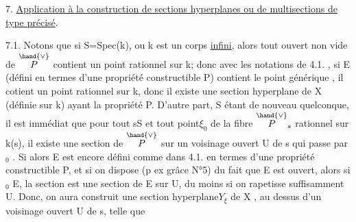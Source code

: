 


7. \uline{Application à la construction de sections hyperplanes ou de multisections
de type précisé}.

7.1. Notons que si S=Spec(k), ou k est un corps \uline{infini}, alors tout ouvert
non vide de $\overset{\hand{\vee}}{P}$ contient un point rationnel sur k; donc avec les notations de
4.1. , si E (défini en termes d'une propriété constructible P) contient
le point générique \hand{$\eta$} , il cotient  un point rationnel sur k, donc
il existe une section hyperplane de X (définie sur k) ayant la propriété P.
D'autre part, S étant de nouveau quelconque, il est immédiat que pour tout
s\hand{$\in$}S et tout point$\xi_0$ de la fibre $\overset{\hand{\vee}}{P}_s$ rationnel sur k(s), il existe une section
\hand{$\xi$} de $\overset{\hand{\vee}}{P}$ sur un voisinage ouvert U de s qui passe par \hand{$\xi$}$_0$ . Si alors E est
encore  défini comme dans 4.1. en termes d'une propriété constructible
P, et si on dispose (p ex grâce  N°5) du fait que E est ouvert, alors
si \hand{$\xi$}$_0$\hand{$\in$} E,  la section \hand{$\xi$} est une section de E sur 
U, du moins si on rapetisse suffisamment U. Donc, on aura construit une
section hyperplane$Y_\xi$ de X , au dessus d'un voisinage ouvert U de s, telle que

